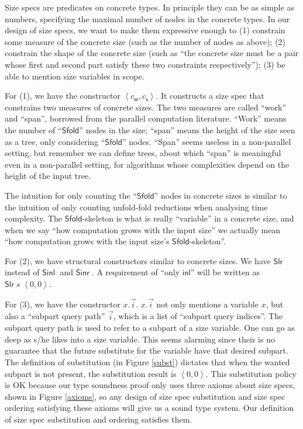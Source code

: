 \documentclass[preprint]{sigplanconf}
\newcommand{\syminl}{\mathsf{inl}}
\newcommand{\symSinl}{\mathsf{Sinl\;}}
\newcommand{\symSinr}{\mathsf{Sinr\;}}
\newcommand{\symSfold}{\mathsf{Sfold}}
\newcommand{\symSlr}{\mathsf{Slr}}
\newcommand{\symwork}{\mathsf{w}}
\newcommand{\symspan}{\mathsf{s}}
\newcommand{\Sstats}[1]{\left \langle #1 \right \rangle}
\begin{document}
Size specs are predicates on concrete types. In principle they can be as simple as numbers, specifying the maximal number of nodes in the concrete types. In our design of size specs, we want to make them expressive enough to (1) constrain some measure of the concrete size (such as the number of nodes as above); (2) constrain the shape of the concrete size (such as ``the concrete size must be a pair whose first and second part satisfy these two constraints respectively''); (3) be able to mention size variables in scope.

For (1), we have the constructor $\Sstats{c_\symwork,c_\symspan}$. It constructs a size spec that constrains two measures of concrete sizes. The two measures are called ``work'' and ``span'', borrowed from the parallel computation literature. ``Work'' means the number of ``$\symSfold$'' nodes in the size; ``span'' means the height of the size seen as a tree, only considering ``$\symSfold$'' nodes. ``Span'' seems useless in a non-parallel setting, but remember we can define trees, about which ``span'' is meaningful even in a non-parallel setting, for algorithms whose complexities depend on the height of the input tree. 

The intuition for only counting the  ``$\symSfold$'' nodes in concrete sizes is similar to the intuition of only counting unfold-fold reductions when analysing time complexity. The $\symSfold$-skeleton is what is really ``variable'' in a concrete size, and when we say ``how computation grows with the input size'' we actually mean ``how computation grows with the input size's $\symSfold$-skeleton''.

For (2), we have structural constructors similar to concrete sizes. We have $\symSlr$ instead of $\symSinl$ and $\symSinr$. A requirement of ``only $\syminl$'' will be written as $\symSlr\;s\;\Sstats{0,0}$.

For (3), we have the constructor $x.\vec{i}$. $x.\vec{i}$ not only mentions a variable $x$, but also a ``subpart query path'' $\vec{i}$, which is a list of ``subpart query indices''. The subpart query path is used to refer to a subpart of a size variable. One can go as deep as s/he likes into a size variable. This seems alarming since their is no guarantee that the future substitute for the variable have that desired subpart. The definition of substitution (in Figure \ref{subst}) dictates that when the wanted subpart is not present, the substitution result is $\Sstats{0,0}$. This substitution policy is OK because our type soundness proof only uses three axioms about size specs, shown in Figure \ref{axioms}, so any design of size spec substitution and size spec ordering satisfying these axioms will give us a sound type system. Our definition of size spec substitution and ordering satisfies them. 
\end{document}
